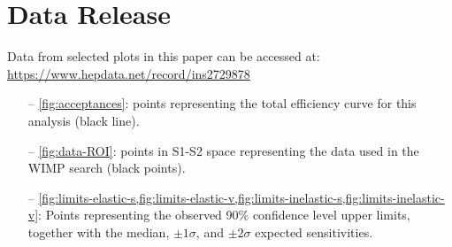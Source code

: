 \documentclass[reprint, showpacs,
preprintnumbers,
amsmath,amssymb,
aps, floatfix,
superscriptaddress,
prd, nofootinbib]{revtex4-1}
\begin{document}
\newpage
\section{Data Release\label{ap:2}}
Data from selected plots in this paper can be accessed at: \href{https://www.hepdata.net/record/ins2729878}{https://www.hepdata.net/record/ins2729878}

\begin{itemize}
    \item[--] \autoref{fig:acceptances}:
   points representing the total efficiency curve for this analysis (black line).
    \item[--] \autoref{fig:data-ROI}: points in S1-S2 space representing the data used in the WIMP search (black points).
    \item[--] \cref{fig:limits-elastic-s,fig:limits-elastic-v,fig:limits-inelastic-s,fig:limits-inelastic-v}: Points representing the observed 90\% confidence level upper limits, together with the median, $\pm1\sigma$, and $\pm2\sigma$ expected sensitivities.
\end{itemize}

\newpage

\end{document}

